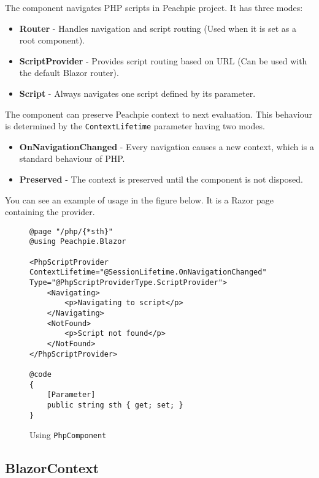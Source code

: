 The component navigates PHP scripts in Peachpie project. It has three modes:
\par
\begin{itemize}
\item \textbf{Router} - Handles navigation and script routing (Used when it is set as a root component).
\item \textbf{ScriptProvider} - Provides script routing based on URL (Can be used with the default Blazor router). 
\item \textbf{Script} - Always navigates one script defined by its parameter. 
\end{itemize}
\par
The component can preserve Peachpie context to next evaluation. This behaviour is determined by the \texttt{ContextLifetime} parameter having two modes.
\par
\begin{itemize}
\item \textbf{OnNavigationChanged} - Every navigation causes a new context, which is a standard behaviour of PHP.
\item \textbf{Preserved} - The context is preserved until the component is not disposed.  
\end{itemize}
\par
You can see an example of usage in the figure below. It is a Razor page containing the provider.
\par
\begin{figure}
\begin{lstlisting}
@page "/php/{*sth}"
@using Peachpie.Blazor

<PhpScriptProvider 
ContextLifetime="@SessionLifetime.OnNavigationChanged"
Type="@PhpScriptProviderType.ScriptProvider">
    <Navigating>
        <p>Navigating to script</p>
    </Navigating>
    <NotFound>
        <p>Script not found</p>
    </NotFound>
</PhpScriptProvider>

@code
{
    [Parameter]
    public string sth { get; set; }
}
\end{lstlisting}
\caption{Using \texttt{PhpComponent}}
\label{img37:phpcomponent}
\end{figure}

\subsection{BlazorContext}

